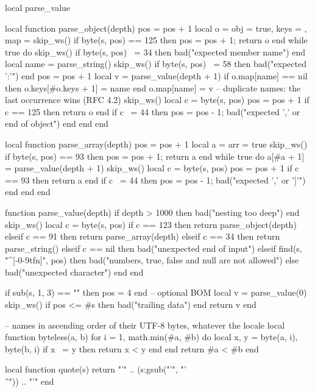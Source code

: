 {  local parse_value

  local function parse_object(depth)
    pos = pos + 1
    local o = { obj = true, keys = {}, map = {} }
    skip_ws()
    if byte(s, pos) == 125 then pos = pos + 1; return o end
    while true do
      skip_ws()
      if byte(s, pos) ~= 34 then bad("expected member name") end
      local name = parse_string()
      skip_ws()
      if byte(s, pos) ~= 58 then bad("expected ':'") end
      pos = pos + 1
      local v = parse_value(depth + 1)
      if o.map[name] == nil then o.keys[#o.keys + 1] = name end
      o.map[name] = v -- duplicate names: the last occurrence wins (RFC 4.2)
      skip_ws()
      local c = byte(s, pos)
      pos = pos + 1
      if c == 125 then return o end
      if c ~= 44 then pos = pos - 1; bad("expected ',' or end of object") end
    end
  end

  local function parse_array(depth)
    pos = pos + 1
    local a = { arr = true }
    skip_ws()
    if byte(s, pos) == 93 then pos = pos + 1; return a end
    while true do
      a[#a + 1] = parse_value(depth + 1)
      skip_ws()
      local c = byte(s, pos)
      pos = pos + 1
      if c == 93 then return a end
      if c ~= 44 then pos = pos - 1; bad("expected ',' or ']'") end
    end
  end

  function parse_value(depth)
    if depth > 1000 then bad("nesting too deep") end
    skip_ws()
    local c = byte(s, pos)
    if c == 123 then return parse_object(depth)
    elseif c == 91 then return parse_array(depth)
    elseif c == 34 then return parse_string()
    elseif c == nil then bad("unexpected end of input")
    elseif find(s, "^[-0-9tfn]", pos) then bad("numbers, true, false and null are not allowed")
    else bad("unexpected character") end
  end

  if sub(s, 1, 3) == "" then pos = 4 end -- optional BOM
  local v = parse_value(0)
  skip_ws()
  if pos <= #s then bad("trailing data") end
  return v
end

-- names in ascending order of their UTF-8 bytes, whatever the locale
local function byteless(a, b)
  for i = 1, math.min(#a, #b) do
    local x, y = byte(a, i), byte(b, i)
    if x ~= y then return x < y end
  end
  return #a < #b
end

local function quote(s) return "'" .. (s:gsub("'", "'\\''")) .. "'" end

}
